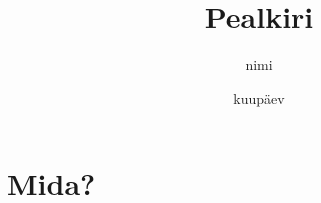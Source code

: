 \documentclass{myarticle}
\title{Pealkiri}
\author{nimi}
\institute{Küberneetika instituut}
\date{kuupäev}
\begin{document}
\maketitle
\section{Mida?}
\end{document}

